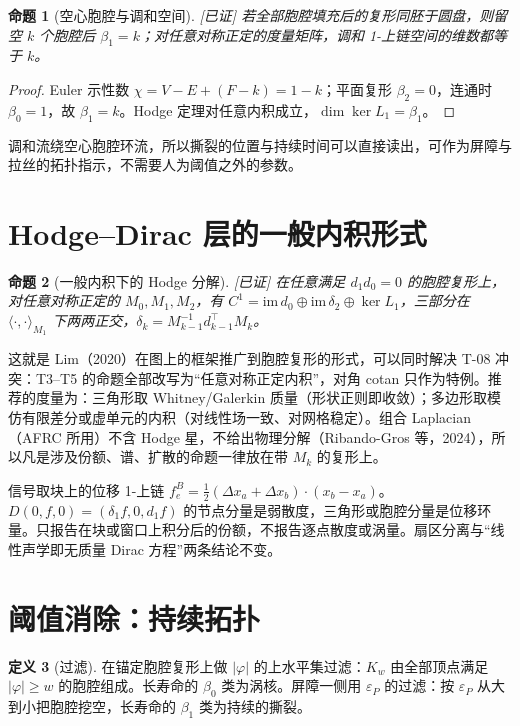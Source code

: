 \documentclass[10.5pt,a4paper]{article}
\theoremstyle{definition}
\newtheorem{definition}{定义}[section]
\theoremstyle{plain}
\newtheorem{proposition}[definition]{命题}
\theoremstyle{remark}
\newcommand{\status}[1]{\hfill{\small\color{accent}\textsf{[#1]}}}
\begin{document}
\begin{proposition}[空心胞腔与调和空间]\status{已证}
若全部胞腔填充后的复形同胚于圆盘，则留空 $k$ 个胞腔后 $\beta_1=k$；对任意对称正定的度量矩阵，调和 1-上链空间的维数都等于 $k$。
\end{proposition}
\begin{proof}
Euler 示性数 $\chi=V-E+(F-k)=1-k$；平面复形 $\beta_2=0$，连通时 $\beta_0=1$，故 $\beta_1=k$。Hodge 定理对任意内积成立，$\dim\ker L_1=\beta_1$。
\end{proof}

调和流绕空心胞腔环流，所以撕裂的位置与持续时间可以直接读出，可作为屏障与拉丝的拓扑指示，不需要人为阈值之外的参数。

\section{Hodge–Dirac 层的一般内积形式}

\begin{proposition}[一般内积下的 Hodge 分解]\status{已证}
在任意满足 $d_1d_0=0$ 的胞腔复形上，对任意对称正定的 $M_0,M_1,M_2$，有 $C^1=\mathrm{im}\,d_0\oplus\mathrm{im}\,\delta_2\oplus\ker L_1$，三部分在 $\langle\cdot,\cdot\rangle_{M_1}$ 下两两正交，$\delta_k=M_{k-1}^{-1}d_{k-1}^\top M_k$。
\end{proposition}

这就是 Lim（2020）在图上的框架推广到胞腔复形的形式，可以同时解决 T-08 冲突：T3–T5 的命题全部改写为“任意对称正定内积”，对角 cotan 只作为特例。推荐的度量为：三角形取 Whitney/Galerkin 质量（形状正则即收敛）；多边形取模仿有限差分或虚单元的内积（对线性场一致、对网格稳定）。组合 Laplacian（AFRC 所用）不含 Hodge 星，不给出物理分解（Ribando-Gros 等，2024），所以凡是涉及份额、谱、扩散的命题一律放在带 $M_k$ 的复形上。

信号取块上的位移 1-上链 $f_e^{B}=\tfrac12(\Delta x_a+\Delta x_b)\cdot(x_b-x_a)$。$D(0,f,0)=(\delta_1f,0,d_1f)$ 的节点分量是弱散度，三角形或胞腔分量是位移环量。只报告在块或窗口上积分后的份额，不报告逐点散度或涡量。扇区分离与“线性声学即无质量 Dirac 方程”两条结论不变。

\section{阈值消除：持续拓扑}\label{sec:persist}

\begin{definition}[过滤]
在锚定胞腔复形上做 $|\varphi|$ 的上水平集过滤：$K_w$ 由全部顶点满足 $|\varphi|\ge w$ 的胞腔组成。长寿命的 $\beta_0$ 类为涡核。屏障一侧用 $\varepsilon_P$ 的过滤：按 $\varepsilon_P$ 从大到小把胞腔挖空，长寿命的 $\beta_1$ 类为持续的撕裂。
\end{definition}
\end{document}

